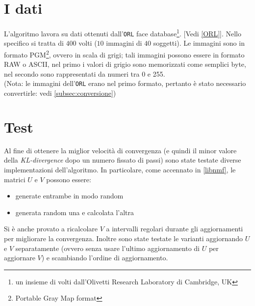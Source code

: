 \documentclass[a4paper]{article} %
\begin{document}
\section{I dati}
L'algoritmo lavora su dati ottenuti dall'\texttt{ORL} face database\footnote{un insieme di volti dall'Olivetti Research Laboratory di Cambridge, UK}. [Vedi \ref{ORL}].
Nello specifico si tratta di $400$ volti ($10$ immagini di $40$ soggetti). Le immagini sono in formato PGM\footnote{Portable Gray Map format}, ovvero in scala di grigi; tali immagini possono essere in formato RAW o ASCII, nel primo i valori di grigio sono memorizzati come semplici byte, nel secondo sono rappresentati da numeri tra 0 e 255. \\ 
(Nota: le immagini dell'\texttt{ORL} erano nel primo formato, pertanto è stato necessario convertirle: vedi \ref{subsec:conversione})

\section{Test}
Al fine di ottenere la miglior velocità di convergenza (e quindi il minor valore della \emph{KL-divergence} dopo un numero fissato di passi) sono state testate diverse implementazioni dell'algoritmo. In particolare, come accennato in \ref{libnmf}, le matrici $U$ e $V$ possono essere:
\begin{itemize}
\item generate entrambe in modo random
\item generata random una e calcolata l'altra
\end{itemize}
Si è anche provato a ricalcolare $V$ a intervalli regolari durante gli aggiornamenti per migliorare la convergenza.
Inoltre sono state testate le varianti aggiornando $U$ e $V$ separatamente (ovvero senza usare l'ultimo aggiornamento di $U$ per aggiornare $V$) e scambiando l'ordine di aggiornamento.

\newpage
\end{document}
